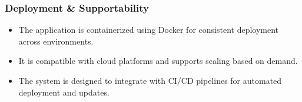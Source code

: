 \subsubsection*{Deployment \& Supportability}

\begin{itemize}
    \item The application is containerized using Docker for consistent deployment across environments.
    
    \item It is compatible with cloud platforms and supports scaling based on demand.
    
    \item The system is designed to integrate with CI/CD pipelines for automated deployment and updates.
\end{itemize}